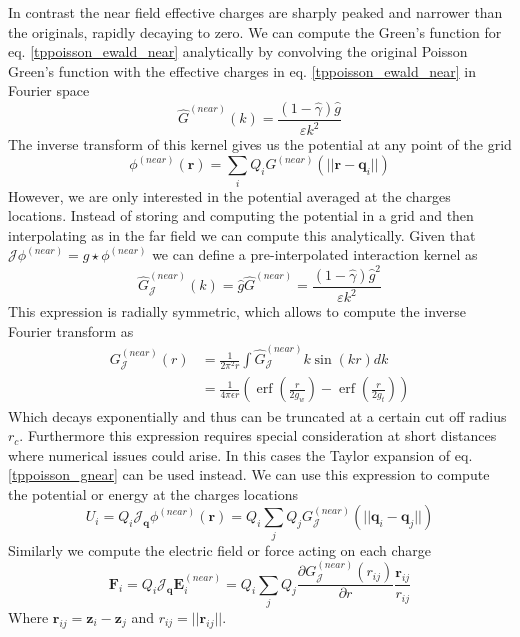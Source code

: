 \documentclass[ twoside,openright,titlepage,numbers=noenddot,%
headinclude,footinclude,cleardoublepage=empty,abstract=on,
BCOR=5mm,paper=a4,fontsize=11pt, dvipsnames
]{scrreprt}
\renewcommand{\vec}[1]{\bm{#1}}
\newcommand{\oper}[1]{\mathcal{#1}}
\DeclareMathOperator{\erf}{erf}
\newcommand{\ppos}{q}
\newcommand{\fpos}{r}
\begin{document}
In contrast the near field effective charges are sharply peaked and narrower than the originals, rapidly decaying to zero. We can compute the Green's function for eq. \eqref{tppoisson_ewald_near} analytically by convolving the original Poisson Green's function with the effective charges in eq. \eqref{tppoisson_ewald_near} in Fourier space
\begin{equation}
  \hat{G}^{(near)}(k) = \frac{(1-\hat{\gamma})\hat{g}}{\varepsilon k^2}
\end{equation}
The inverse transform of this kernel gives us the potential at any point of the grid 
\begin{equation}
  \phi^{(near)}(\vec{\fpos}) = \sum_i{Q_iG^{(near)}(||\vec{\fpos}-\vec{\ppos}_i||)}
\end{equation}
However, we are only interested in the potential averaged at the charges locations. Instead of storing and computing the potential in a grid and then interpolating as in the far field we can compute this analytically. Given that $\oper{J} \phi^{(near)} = g\star \phi^{(near)}$ we can define a pre-interpolated interaction kernel as
\begin{equation}
  \hat{G}_{\oper{J}}^{(near)}(k) = \hat{g}\hat{G}^{(near)} = \frac{(1-\hat{\gamma})\hat{g}^2}{\varepsilon k^2}
\end{equation}
This expression is radially symmetric, which allows to compute the inverse Fourier transform as
\begin{equation}
  \label{tppoisson_gnear}
  \begin{aligned}
    G_{\oper{J}}^{(near)}(r) &= \frac{1}{2\pi^2r}\int{\hat{G}^{(near)}_{\oper{J}}k \sin(kr)dk} \\
            &= \frac{1}{4\pi\epsilon r}\left(\erf\left(\frac{r}{2g_w}\right) - \erf\left(\frac{r}{2g_t}\right)\right)
  \end{aligned}
\end{equation}
Which decays exponentially and thus can be truncated at a certain cut off radius $r_c$. Furthermore this expression requires special consideration at short distances where numerical issues could arise. In this cases the Taylor expansion of eq. \eqref{tppoisson_gnear} can be used instead.
We can use this expression to compute the potential or energy at the charges locations
\begin{equation}
  U_i = Q_i\oper{J}_{\vec{\ppos}}\phi^{(near)}(\vec{\fpos}) = Q_i\sum_j{Q_jG_{\oper{J}}^{(near)}(||\vec{\ppos}_i - \vec{\ppos}_j||)}
\end{equation}
Similarly we compute the electric field or force acting on each charge 
\begin{equation}
  \vec{F}_i = Q_i \oper{J}_{\vec{\ppos}} \vec{E}^{(near)}_i = Q_i\sum_j{Q_j\frac{\partial G_{\oper{J}}^{(near)}({r_{ij}})}{\partial r}\frac{\vec{r}_{ij}}{r_{ij}}}
\end{equation}
Where $\vec{r}_{ij} = \vec{z}_i - \vec{z}_j$ and $r_{ij} = ||\vec{r}_{ij}||$.
\end{document}
